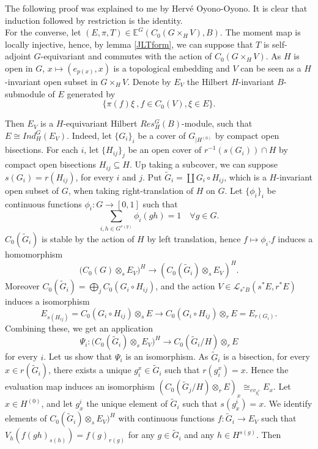 \begin{dem} The following proof was explained to me by Hervé Oyono-Oyono. It is clear that induction followed by restriction is the identity.\\ 

For the converse, let $(E,\pi,T)\in \mathbb E^G(C_0(G\times_H V),B)$. The moment map is locally injective, hence, by lemma \ref{JLTform}, we can suppose that $T$ is self-adjoint $G$-equivariant and commutes with the action of $C_0(G\times_H V)$. As $H$ is open in $G$, $x\mapsto (e_{p(x)},x)$ is a topological embedding and $V$ can be seen as a $H$-invariant open subset in $G\times_H V$. Denote by $E_V$ the Hilbert $H$-invariant $B$-submodule of $E$ generated by 
\[\{\pi(f)\xi \ ,f\in C_0(V), \xi\in E\}.\]

Then $E_{V}$ is a $H$-equivariant Hilbert $Res_H^G(B)$-module, such that $E\cong Ind_H^G (E_V)$. Indeed, let $\{G_i\}_i$ be a cover of $G_{|H^{(0)}}$ by compact open bisections. For each $i$, let $\{H_{ij}\}_j$ be an open cover of $r^{-1}( s(G_i))\cap H$ by compact open bisections $H_{ij} \subseteq H$. Up taking a subcover, we can suppose $s(G_i) = r(H_{ij})$, for every $i$ and $j$. Put $\tilde G_i = \coprod G_i \circ H_{ij}$, which is a $H$-invariant open subset of $G$, when taking right-translation of $H$ on $G$. Let $\{\phi_i\}_i$ be continuous functions $\phi_i : G\rightarrow [0,1]$ such that 
\[\sum_{i, h\in G^{s(g)}} \phi_i(gh) = 1\quad \forall g\in G.\]
$C_0(\tilde G_i)$ is stable by the action of $H$ by left translation, hence $f\mapsto \phi_i . f$ induces a homomorphism 
\[\Big(C_0(G)\otimes_s E_V\Big)^H \rightarrow \left( C_0(\tilde G_i)\otimes_s E_V\right)^H .\] 
Moreover $C_0(\tilde G_i) = \bigoplus_j C_0(G_i\circ H_{ij})$, and the action $V\in \mathcal L_{s^*B}(s^* E, r^* E)$ induces a isomorphism
\[ E_{s(H_{ij})}=C_0(G_i\circ H_{ij})\otimes_s E \rightarrow C_0(G_i\circ H_{ij})\otimes_r E = E_{r(G_{i})}. \]
Combining these, we get an application 
\[\Psi_i : \Big(C_0(\tilde G_i)\otimes_s E_V\Big)^H \rightarrow C_0(\tilde G_i/H)\otimes_r E \]
for every $i$. Let us show that $\Psi_i$ is an isomorphism. As $\tilde G_i$ is a bisection, for every $x\in r(\tilde G_i)$, there exists a unique $g_i^x\in \tilde G_i$ such that $r(g_i^x)=x$. Hence the evaluation map induces an isomorphism $\left( C_0(\tilde G_j / H) \otimes_r E \right)_x \cong_{ev_{g_i^x}} E_x$. Let $x\in H^{(0)}$, and let $g^{i}_x$ the unique element of $\tilde G_i$ such that $s(g^{i}_x) = x$. We identify elements of $C_0(\tilde G_i)\otimes_s E_V)^H$ with continuous functions $f : \tilde G_i \rightarrow E_V$ such that $V_h(f(gh)_{s(h)})= f(g)_{r(g)}$ for any $g\in \tilde G_i$ and any $h\in H^{s(g)}$. Then 

\end{dem}
